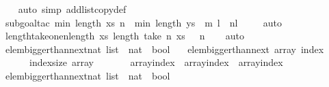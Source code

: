 \begin{isabellebody}
%
\isadelimproof
\ \ %
\endisadelimproof
%
\isatagproof
{}\isamarkupfalse%
\ {\isacharparenleft}auto\ simp\ add{\isacharcolon}list{\isacharunderscore}copy{\isacharunderscore}def{\isacharparenright}\isanewline
\ \ \isamarkupfalse%
\ {\isacharparenleft}subgoal{\isacharunderscore}tac\ {\isachardoublequoteopen}min\ {\isacharparenleft}length\ xs{\isacharparenright}\ n\ {\isacharplus}\ min\ {\isacharparenleft}length\ ys\ {\isacharminus}\ m{\isacharparenright}\ l\ {\isacharequal}\ n{\isacharplus}l{\isachardoublequoteclose}{\isacharparenright}\isanewline
\ \ \ \isamarkupfalse%
\ auto\isanewline
\ \ \isamarkupfalse%
%
\endisatagproof
{\isafoldproof}%
%
\isadelimproof
\isanewline
%
\endisadelimproof
{}\isamarkupfalse%
\ length{\isacharunderscore}take{\isacharunderscore}one{\isacharcolon}{\isachardoublequoteopen}n{\isasymle}length\ xs\ {\isasymLongrightarrow}length\ {\isacharparenleft}take\ n\ xs{\isacharparenright}\ {\isacharequal}\ \ n{\isachardoublequoteclose}\isanewline
%
\isadelimproof
\ \ %
\endisadelimproof
%
\isatagproof
{}\isamarkupfalse%
\ auto%
\endisatagproof
{\isafoldproof}%
%
\isadelimproof
\isanewline
%
\endisadelimproof
\isanewline
{}\isamarkupfalse%
\ elem{\isacharunderscore}bigger{\isacharunderscore}than{\isacharunderscore}next{\isacharunderscore}{}{\isacharcolon}{\isacharcolon}{\isachardoublequoteopen}nat\ list\ {\isasymRightarrow}\ nat\ {\isasymRightarrow}\ bool{\isachardoublequoteclose}\isanewline
\ \ \ {\isachardoublequoteopen}elem{\isacharunderscore}bigger{\isacharunderscore}than{\isacharunderscore}next{\isacharunderscore}{}\ array\ index\ {\isasymequiv}\isanewline
\ \ \ \ \ \ {\isacharparenleft}index{\isacharplus}{}{\isacharless}{\isacharparenleft}size\ array{\isacharparenright}{\isacharparenright}\ {\isasymlongrightarrow}\isanewline
\ \ \ \ \ \ {\isacharparenleft}array{\isacharbang}index{\isacharparenright}\ {\isachargreater}\ {\isacharparenleft}array{\isacharbang}{\isacharparenleft}index{\isacharplus}{}{\isacharparenright}{\isacharparenright}\ {\isacharplus}\ {\isacharparenleft}array{\isacharbang}{\isacharparenleft}index{\isacharplus}{}{\isacharparenright}{\isacharparenright}{\isachardoublequoteclose}\isanewline
\isanewline
{}\isamarkupfalse%
\ elem{\isacharunderscore}bigger{\isacharunderscore}than{\isacharunderscore}next{\isacharcolon}{\isacharcolon}{\isachardoublequoteopen}nat\ list\ {\isasymRightarrow}\ nat\ {\isasymRightarrow}\ bool{\isachardoublequoteclose}\isanewline

\end{isabellebody}
